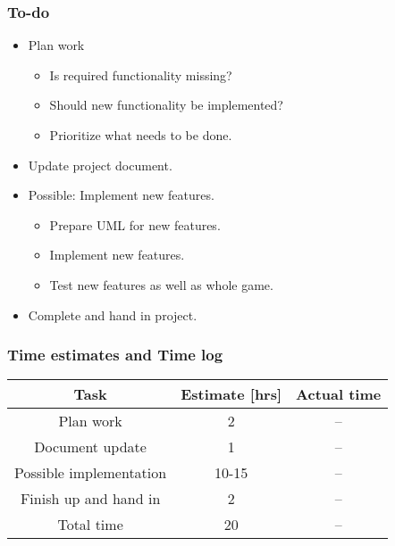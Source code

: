 \documentclass[12pt, letterpaper]{article}
\begin{document}
\subsubsection{To-do}
\begin{itemize}
	\item Plan work
	\begin{itemize}
		\item Is required functionality missing?
		\item Should new functionality be implemented?
		\item Prioritize what needs to be done.
	\end{itemize}
	\item Update project document.
	\item Possible: Implement new features.
	\begin{itemize}
		\item Prepare UML for new features.
		\item Implement new features.
		\item Test new features as well as whole game.
	\end{itemize}
	\item Complete and hand in project.
\end{itemize}
\subsubsection{Time estimates and Time log}
\begin{center}
	\begin{tabular}{|c|c|c|} 
		\hline
		Task & Estimate [hrs] & Actual time \\ [0.5ex] 
		\hline\hline
		Plan work & 2 & -- \\ 
		\hline
		Document update & 1 & --\\
		\hline 
		Possible implementation & 10-15 & -- \\ 
		\hline
		Finish up and hand in & 2 & --\\ 
		\hline 
		Total time & 20 & --\\ [1ex]
		\hline
		
	\end{tabular}
\end{center}
\newpage
\end{document}
